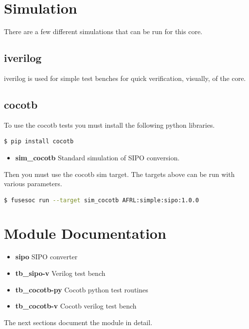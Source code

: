 \newpage

\section{Simulation}
\par
There are a few different simulations that can be run for this core.

\subsection{iverilog}
\par
iverilog is used for simple test benches for quick verification, visually, of the core.

\subsection{cocotb}
\par
To use the cocotb tests you must install the following python libraries.
\begin{lstlisting}[language=bash]
  $ pip install cocotb
\end{lstlisting}

\begin{itemize}
  \item \textbf{sim\_cocotb} Standard simulation of SIPO conversion.
\end{itemize}

Then you must use the cocotb sim target. The targets above can be run with various parameters.
\begin{lstlisting}[language=bash]
  $ fusesoc run --target sim_cocotb AFRL:simple:sipo:1.0.0
\end{lstlisting}

\newpage

\section{Module Documentation} \label{Module Documentation}

\par

\begin{itemize}
\item \textbf{sipo} SIPO converter\\
\item \textbf{tb\_sipo-v} Verilog test bench\\
\item \textbf{tb\_cocotb-py} Cocotb python test routines\\
\item \textbf{tb\_cocotb-v} Cocotb verilog test bench\\
\end{itemize}
The next sections document the module in detail.

